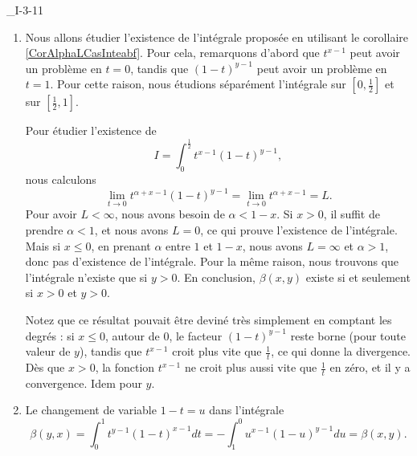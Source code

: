 

\begin{corrige}{_I-3-11}

\begin{enumerate}
\item 

Nous allons étudier l'existence de l'intégrale proposée en utilisant le corollaire \ref{CorAlphaLCasInteabf}. Pour cela, remarquons d'abord que $t^{x-1}$ peut avoir un problème en $t=0$, tandis que $(1-t)^{y-1}$ peut avoir un problème en $t=1$. Pour cette raison, nous étudions séparément l'intégrale sur $[0,\frac{ 1 }{2}]$ et sur $[\frac{ 1 }{2},1]$.

Pour étudier l'existence de 
\begin{equation}
	I=\int_0^{\frac{ 1 }{2}}t^{x-1}(1-t)^{y-1},
\end{equation}
nous calculons
\begin{equation}
	\lim_{t\to0}t^{\alpha+x-1}(1-t)^{y-1}=\lim_{t\to 0}t^{\alpha+x-1}=L.
\end{equation}
Pour avoir $L<\infty$, nous avons besoin de $\alpha<1-x$. Si $x>0$, il suffit de prendre $\alpha<1$, et nous avons $L=0$, ce qui prouve l'existence de l'intégrale. Mais si $x\leq 0$, en prenant $\alpha$ entre $1$ et $1-x$, nous avons $L=\infty$ et $\alpha>1$, donc pas d'existence de l'intégrale. Pour la même raison, nous trouvons que l'intégrale n'existe que si $y>0$. En conclusion, $\beta(x,y)$ existe si et seulement si $x>0$ et $y>0$. 

Notez que ce résultat pouvait être deviné très simplement en comptant les degrés : si $x\leq 0$, autour de $0$, le facteur $(1-t)^{y-1}$ reste borne (pour toute valeur de $y$), tandis que $t^{x-1}$ croit plus vite que $\frac{1}{ t }$, ce qui donne la divergence. Dès que $x>0$, la fonction $t^{x-1}$ ne croit plus aussi vite que $\frac{1}{ t }$ en zéro, et il y a convergence. Idem pour $y$.

\item
Le changement de variable $1-t=u$ dans l'intégrale
\begin{equation}
	\beta(y,x)=\int_0^1t^{y-1}(1-t)^{x-1}dt=-\int_1^0u^{x-1}(1-u)^{y-1}du=\beta(x,y).
\end{equation}


\end{enumerate}
\end{corrige}
